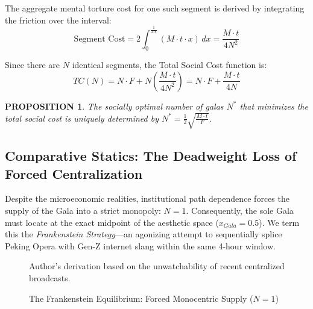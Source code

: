 \documentclass[AER]{AEA}
\newtheorem{proposition}{PROPOSITION}
\begin{document}
The aggregate mental torture cost for one such segment is derived by integrating the friction over the interval:
\begin{equation}
    \text{Segment Cost} = 2 \int_{0}^{\frac{1}{2N}} (M \cdot t \cdot x) \, dx = \frac{M \cdot t}{4N^2}
\end{equation}

Since there are $N$ identical segments, the Total Social Cost function is:
\begin{equation}
    TC(N) = N \cdot F + N \left( \frac{M \cdot t}{4N^2} \right) = N \cdot F + \frac{M \cdot t}{4N}
\end{equation}

\begin{proposition}
The socially optimal number of galas $N^*$ that minimizes the total social cost is uniquely determined by $N^* = \frac{1}{2} \sqrt{\frac{M \cdot t}{F}}$.
\end{proposition}

\subsection{Comparative Statics: The Deadweight Loss of Forced Centralization}

Despite the microeconomic realities, institutional path dependence forces the supply of the Gala into a strict monopoly: $N = 1$. Consequently, the sole Gala must locate at the exact midpoint of the aesthetic space ($x_{Gala} = 0.5$). We term this the \textit{Frankenstein Strategy}—an agonizing attempt to sequentially splice Peking Opera with Gen-Z internet slang within the same 4-hour window.

\begin{figure}[ht]
\centering
{}
\caption{The Frankenstein Equilibrium: Forced Monocentric Supply ($N=1$)}
\begin{figurenotes}[Source]
Author's derivation based on the unwatchability of recent centralized broadcasts.
\end{figurenotes}
\end{figure}
\end{document}

